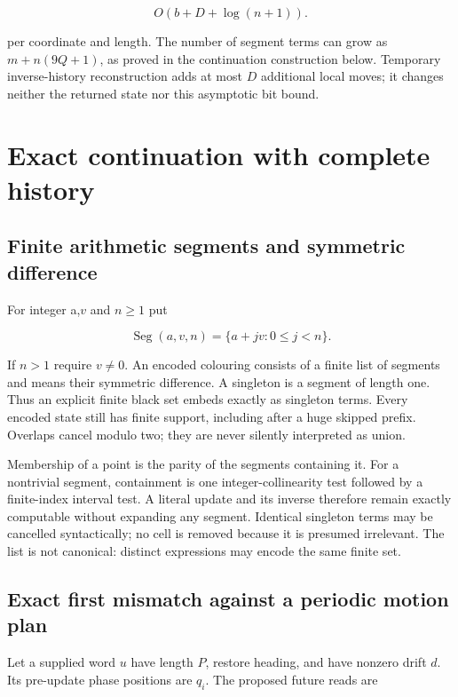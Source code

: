 \documentclass[
  11pt,
]{article}
\begin{document}
\begin{equation}\label{eq:geo9}
O(b+D+\log(n+1)).
\end{equation}

per coordinate and length. The number of segment terms can grow as
$m+n(9Q+1)$, as proved in the continuation construction below. Temporary inverse-history reconstruction
adds at most \(D\) additional local moves; it changes neither the returned
state nor this asymptotic bit bound.

\section{Exact continuation with complete
history}\label{exact-continuation-with-complete-history}

\subsection{Finite arithmetic segments and symmetric difference}\label{xor-2}

For integer a,\(v\) and $n\ge1$ put

\[
\operatorname{Seg}(a,v,n)=\{a+jv:0\le j<n\}.
\]

If $n>1$ require $v\ne0$. An encoded colouring consists of a
finite list of segments and means their symmetric difference. A
singleton is a segment of length one. Thus an explicit finite black set
embeds exactly as singleton terms. Every encoded state still has finite
support, including after a huge skipped prefix. Overlaps cancel modulo
two; they are never silently interpreted as union.

Membership of a point is the parity of the segments containing it. For a
nontrivial segment, containment is one integer-collinearity test
followed by a finite-index interval test. A literal update and its
inverse therefore remain exactly computable without expanding any
segment. Identical singleton terms may be cancelled syntactically; no
cell is removed because it is presumed irrelevant. The list is not
canonical: distinct expressions may encode the same finite set.

\subsection{Exact first mismatch against a periodic motion
plan}\label{xor-3}

Let a supplied word \(u\) have length \(P\), restore heading, and have nonzero
drift \(d\). Its pre-update phase positions are $q_i$. The proposed future
reads are
\end{document}

